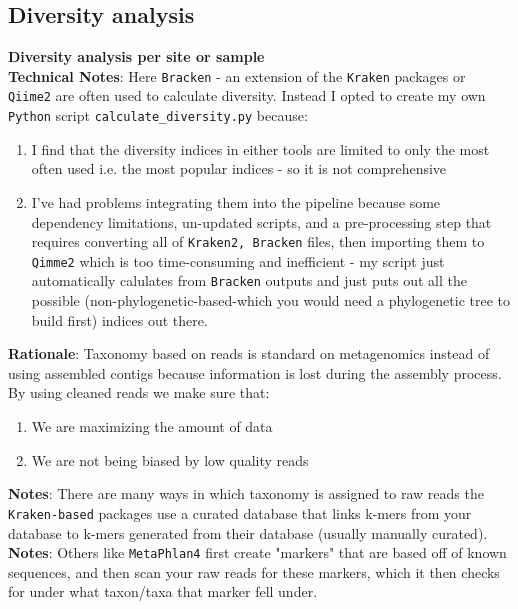 \documentclass[11pt]{report}
\begin{document}
\subsection{Diversity analysis}	
\textbf{Diversity analysis per site or sample} 
\\ \textbf{Technical Notes}: Here \texttt{Bracken} - an extension of the \texttt{Kraken} packages or \texttt{Qiime2} are often used to calculate diversity. Instead I opted to create my own \texttt{Python} script \texttt{calculate\_diversity.py} because:
	 \begin{enumerate}
	\item I find that the diversity indices in either tools are limited to only the most often used i.e. the most popular indices - so it is not comprehensive
	\item I've had problems integrating them into the pipeline because some dependency limitations, un-updated scripts, and a pre-processing step that requires converting all of \texttt{Kraken2, Bracken} files, then importing them to \texttt{Qimme2} which is too time-consuming and inefficient - my script just automatically calulates from \texttt{Bracken} outputs and just puts out all the possible (non-phylogenetic-based-which you would need a phylogenetic tree to build first) indices out there.  
	\end{enumerate}
\textbf{Rationale}: Taxonomy based on reads is standard on metagenomics instead of using assembled contigs because information is lost during the assembly process. By using cleaned reads we make sure that: 
\begin{enumerate}
	\item We are maximizing the amount of data
	\item We are not being biased by low quality reads
\end{enumerate}
\textbf{Notes}: There are many ways in which taxonomy is assigned to raw reads the \texttt{Kraken-based} packages use a curated database that links k-mers from your database to k-mers generated from their database (usually manually curated).  
\\ \textbf{Notes}: Others like \texttt{MetaPhlan4} first create "markers" that are based off of known sequences, and then scan your raw reads for these markers, which it then checks for under what taxon/taxa that marker fell under. 
\end{document}
